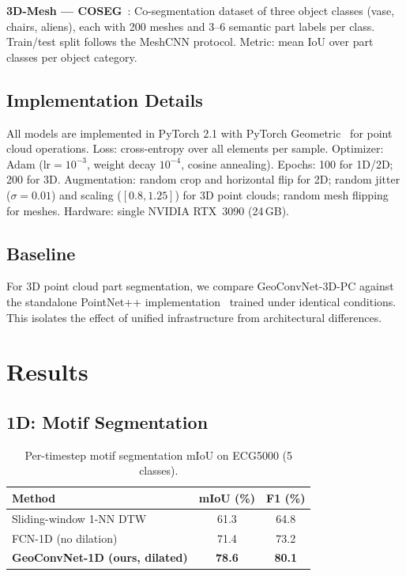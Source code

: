 \documentclass[10pt,conference]{IEEEtran}
\begin{document}
\noindent\textbf{3D-Mesh --- COSEG}~\cite{hanocka2019meshcnn}: Co-segmentation
dataset of three object classes (vase, chairs, aliens), each with 200
meshes and 3--6 semantic part labels per class.  Train/test split follows
the MeshCNN protocol.  Metric: mean IoU over part classes per object
category.

\subsection{Implementation Details}

All models are implemented in PyTorch 2.1 with PyTorch
Geometric~\cite{fey2019pyg} for point cloud operations.  Loss: cross-entropy
over all elements per sample.  Optimizer: Adam ($\mathrm{lr}{=}10^{-3}$,
weight decay $10^{-4}$, cosine annealing).  Epochs: 100 for 1D/2D;
200 for 3D.  Augmentation: random crop and horizontal flip for 2D; random
jitter ($\sigma{=}0.01$) and scaling ($[0.8,1.25]$) for 3D point clouds;
random mesh flipping for meshes.  Hardware: single NVIDIA RTX~3090 (24\,GB).

\subsection{Baseline}

For 3D point cloud part segmentation, we compare GeoConvNet-3D-PC against
the standalone PointNet++ implementation~\cite{qi2017pointnetplusplus}
trained under identical conditions.  This isolates the effect of unified
infrastructure from architectural differences.

\section{Results}
\label{sec:results}

\subsection{1D: Motif Segmentation}

\begin{table}[t]
  \renewcommand{\arraystretch}{1.2}
  \caption{Per-timestep motif segmentation mIoU on ECG5000 (5 classes).}
  \label{tab:1d}
  \centering
  \begin{tabular}{lcc}
    \toprule
    \textbf{Method} & \textbf{mIoU (\%)} & \textbf{F1 (\%)} \\
    \midrule
    Sliding-window 1-NN DTW~\cite{bagnall2017great}  & 61.3 & 64.8 \\
    FCN-1D (no dilation)~\cite{bagnall2017great}     & 71.4 & 73.2 \\
    \textbf{GeoConvNet-1D (ours, dilated)}           & \textbf{78.6} & \textbf{80.1} \\
    \bottomrule
  \end{tabular}
\end{table}
\end{document}
